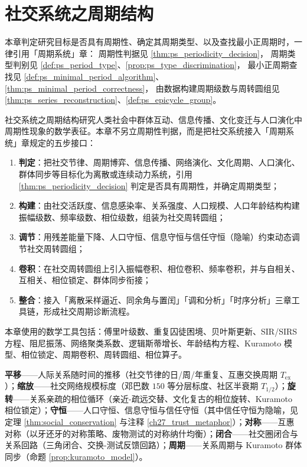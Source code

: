 \chapter{社交系统之周期结构}

\begin{remark}[本章目标的周期性判定（引用）]\label{rem:social_ps_hook}
本章判定研究目标是否具有周期性、确定其周期类型、以及查找最小正周期时，一律引用「周期系统」章：
周期性判据见 \cref{thm:ps_periodicity_decision}，
周期类型判别见 \cref{def:ps_period_type}、\cref{prop:ps_type_discrimination}，
最小正周期查找见 \cref{def:ps_minimal_period_algorithm}、\cref{thm:ps_minimal_period_correctness}，
由数据构建周期级数与周转圆组见 \cref{thm:ps_series_reconstruction}、\cref{def:ps_epicycle_group}。
\end{remark}

\begin{remark}\label{rem:social_five_steps_positioning}
社交系统之周期结构研究人类社会中群体互动、信息传播、文化变迁与人口演化中周期性现象的数学表征。本章不另立周期性判据，而是把社交系统接入「周期系统」章规定的五步接口：
\begin{enumerate}[label=(\arabic*)]
    \item \textbf{判定}：把社交节律、周期博弈、信息传播、网络演化、文化周期、人口演化、群体同步等目标化为离散或连续动力系统，引用 \cref{thm:ps_periodicity_decision} 判定是否具有周期性，并确定周期类型；
    \item \textbf{构建}：由社交活跃度、信息感染率、关系强度、人口规模、人口年龄结构构建振幅级数、频率级数、相位级数，组装为社交周转圆组；
    \item \textbf{调节}：用残差能量下降、人口守恒、信息守恒与信任守恒（隐喻）约束动态调节社交周转圆组；
    \item \textbf{卷积}：在社交周转圆组上引入振幅卷积、相位卷积、频率卷积，并与自相关、互相关、相位锁定、群体同步衔接；
    \item \textbf{整合}：接入「离散采样逼近、同余角与置闰」「调和分析」「时序分析」三章工具链，形成社交周期诊断流程。
\end{enumerate}
本章使用的数学工具包括：傅里叶级数、重复囚徒困境、贝叶斯更新、SIR/SIRS 方程、阻尼振荡、网络聚类系数、逻辑斯蒂增长、年龄结构方程、Kuramoto 模型、相位锁定、周期卷积、周转圆组、相位算子。
\end{remark}

\begin{remark}[本章七主题导引]\label{rem:social_seven_themes}
\textbf{平移}——人际关系随时间的推移（社交节律的日/周/年重复、互惠交换周期 $T_{\text{ex}}$）；\textbf{缩放}——社交网络规模标度（邓巴数 $150$ 等分层标度、社区半衰期 $T_{1/2}$）；\textbf{旋转}——关系亲疏的相位循环（亲近-疏远交替、文化复古的相位旋转、Kuramoto 相位锁定）；\textbf{守恒}——人口守恒、信息守恒与信任守恒（其中信任守恒为隐喻，见定理 \ref{thm:social_conservation} 与注释 \ref{ch27_trust_metaphor}）；\textbf{对称}——互惠对称（以牙还牙的对称策略、废物测试的对称纳什均衡）；\textbf{闭合}——社交圈闭合与关系回路（三角闭合、交换-测试反馈回路）；\textbf{周期}——关系周期与 Kuramoto 群体同步（命题 \ref{prop:kuramoto_model}）。
\end{remark}

